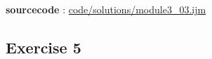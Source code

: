 \textbf{sourcecode} : \href{https://github.com/miura/mod3conversionTest2/blob/struct_authorea/module3_03.ijm}{code/solutions/module3\_03.ijm}

\subsection{Exercise 5}